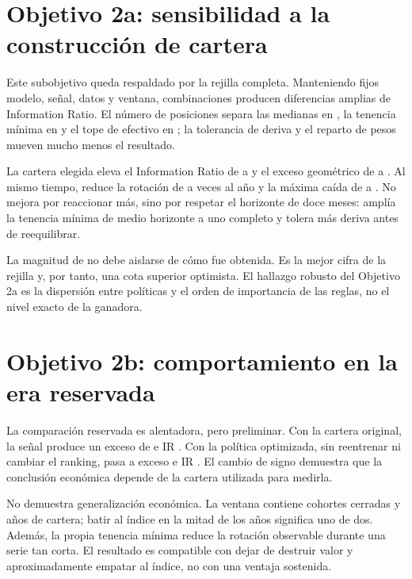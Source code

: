 \section{Objetivo 2a: sensibilidad a la construcción de cartera}

Este subobjetivo queda respaldado por la rejilla completa. Manteniendo fijos modelo, señal, datos y
ventana, \NumCarteras{} combinaciones producen diferencias amplias de Information Ratio. El número
de posiciones separa las medianas en \InfluenciaPosiciones{}, la tenencia mínima en
\InfluenciaTenencia{} y el tope de efectivo en \InfluenciaEfectivo{}; la tolerancia de deriva y el
reparto de pesos mueven mucho menos el resultado.

La cartera elegida eleva el Information Ratio de \IRModelo{} a \IRCartera{} y el exceso geométrico
de \ExcesoModelo{} a \ExcesoCartera{}. Al mismo tiempo, reduce la rotación de \TurnoverModelo{} a
\TurnoverCartera{} veces al año y la máxima caída de \MDDModelo{} a \MDDCartera{}. No mejora por
reaccionar más, sino por respetar el horizonte de doce meses: amplía la tenencia mínima de medio
horizonte a uno completo y tolera más deriva antes de reequilibrar.

La magnitud de \IRCartera{} no debe aislarse de cómo fue obtenida. Es la mejor cifra de la rejilla y,
por tanto, una cota superior optimista. El hallazgo robusto del Objetivo 2a es la dispersión entre
políticas y el orden de importancia de las reglas, no el nivel exacto de la ganadora.

\section{Objetivo 2b: comportamiento en la era reservada}

La comparación reservada es alentadora, pero preliminar. Con la cartera original, la señal produce
un exceso de \ExcesoModeloReservado{} e IR \IRModeloReservado{}. Con la política optimizada, sin
reentrenar ni cambiar el ranking, pasa a exceso \ExcesoCarteraReservado{} e IR
\IRCarteraReservado{}. El cambio de signo demuestra que la conclusión económica depende de la
cartera utilizada para medirla.

No demuestra generalización económica. La ventana contiene \CohortesReservadas{} cohortes cerradas
y \AnosCarteraReservada{} años de cartera; batir al índice en la mitad de los años significa uno de
dos. Además, la propia tenencia mínima reduce la rotación observable durante una serie tan corta.
El resultado es compatible con dejar de destruir valor y aproximadamente empatar al índice, no con
una ventaja sostenida.

